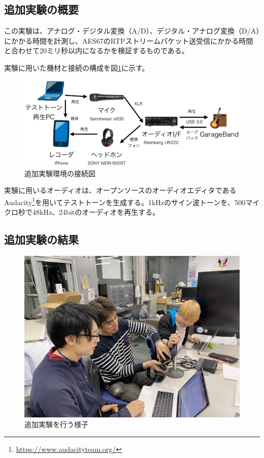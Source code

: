 \subsection{追加実験の概要}

この実験は、アナログ・デジタル変換（A/D）、デジタル・アナログ変換（D/A）にかかる時間を計測し、AES67のRTPストリームパケット送受信にかかる時間と合わせて20ミリ秒以内になるかを検証するものである。

実験に用いた機材と接続の構成を図\ref{fig:advance_test}に示す。

\begin{figure}[tbp]
  \centering
  \includegraphics[width=\linewidth]{img/advance_test.pdf}
  \caption{追加実験環境の接続図}
  \label{fig:advance_test}
\end{figure}

実験に用いるオーディオは、オープンソースのオーディオエディタであるAudacity\footnote{\url{https://www.audacityteam.org/}}を用いてテストトーンを生成する。1kHzのサイン波トーンを、500マイクロ秒で48kHz、24bitのオーディオを再生する。

\subsection{追加実験の結果}

\begin{figure}[tbp]
  \centering
  \includegraphics[width=\linewidth]{img/advance_test_people.jpg}
  \caption{追加実験を行う様子}
  \label{fig:advance_test_people}
\end{figure}

